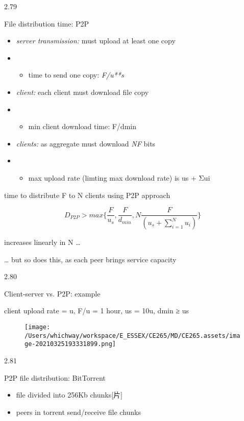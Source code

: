 \documentclass[
]{article}
\begin{document}
2.79

File distribution time: P2P

\begin{itemize}
\item
  \emph{server transmission:} must upload at least one copy
\item
  \begin{itemize}
  \item
    time to send one copy: \emph{F/u**s}
  \end{itemize}
\item
  \emph{client:} each client must download file copy
\item
  \begin{itemize}
  \item
    min client download time: F/dmin
  \end{itemize}
\item
  \emph{clients:} as aggregate must download \emph{NF} bits
\item
  \begin{itemize}
  \item
    max upload rate (limting max download rate) is us + Σui
  \end{itemize}
\end{itemize}

time to distribute F to N clients using P2P approach

\[D_{P2P} > max\{\frac{F}{u_s},\frac{F}{d_{min}},N \frac{F}{(u_s + \sum_{i=1}^{N} {u_i})}\}\]

increases linearly in N \ldots{}

\ldots{} but so does this, as each peer brings service capacity

2.80

Client-server vs. P2P: example

client upload rate = u, F/u = 1 hour, us = 10u, dmin ≥ us

\begin{figure}
\centering
\texttt{[image: /Users/whichway/workspace/E\_ESSEX/CE265/MD/CE265.assets/image-20210325193331899.png]}
\caption{}
\end{figure}

2.81

P2P file distribution: BitTorrent

\begin{itemize}
\item
  file divided into 256Kb chunks{[}片{]}
\item
  peers in torrent send/receive file chunks
\end{itemize}
\end{document}
